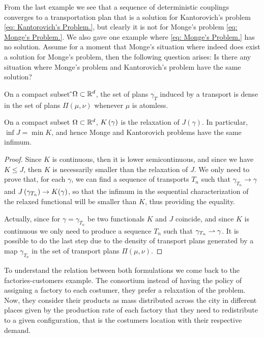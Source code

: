 From the last example we see that a sequence of deterministic couplings converges to a transportation plan that is a solution for Kantorovich's problem \eqref{eq: Kantorovich's Problem.}, but clearly it is not for Monge's problem \eqref{eq: Monge's Problem.}. We also gave one example where \eqref{eq: Monge's Problem.} has no solution. Assume for a moment that Monge's  situation where indeed does exist a solution for Monge's problem, then the following question arises: Is there any situation where Monge's problem and Kantorovich's problem have the same solution?

\begin{lemma}
On a compact subset  ̋$\Omega \subset \mathbb{R}^d$, the set of plans $\gamma_T$ induced by a transport is dense in the set of plans $\Pi(\mu, \nu) $ whenever $\mu$ is atomless.\label{lem: Density of maps.}
\end{lemma}

\begin{theorem}
On a compact subset $\Omega \subset \mathbb{R}^d$,  $K\left(\gamma\right)$ is the relaxation of $J(\gamma)$. In particular, $\inf J = \min K$, and hence Monge and Kantorovich problems have the same infimum.
\end{theorem}
\begin{proof}
Since $K$ is continuous, then it is lower semicontinuous, and since we have $K\leq J$, then $K$ is necessarily smaller than the relaxation of $J$. We only need to prove that, for each $\gamma$, we can find a sequence of transports $T_n$ such that $\gamma_{T_n}\rightarrow \gamma$ and $J\left( \gamma_{T_n} \right)\rightarrow K(\gamma)$, so that the infimum in the sequential characterization of the relaxed functional will be smaller than $K$, thus providing the equality. 

Actually, since for $\gamma=\gamma_{T_n}$ be two functionals $K$ and $J$ coincide, and since $K$ is continuous we only need to produce a sequence $T_n$ such that $\gamma_{T_n}\rightharpoonup\gamma$. It is possible to do the last step due to the density of transport plans generated by a map $\gamma_{T_n}$ in the set of transport plans $\Pi(\mu, \nu)$.
\end{proof}

To understand the relation between both formulations we come back to the factories-customers example. The consortium instead of having the policy of assigning a factory to each costumer, they prefer a relaxation of the problem. Now, they consider their products as mass distributed across the city in different places given by the production rate of each factory that they need to redistribute to a given configuration, that is the costumers location with their respective demand. 

